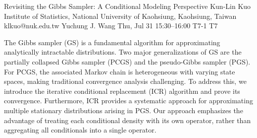 \begin{talk}
  {Revisiting the Gibbs Sampler: A Conditional Modeling Perspective}%
  {Kun-Lin Kuo}%
  {Institute of Statistics, National University of Kaohsiung, Kaohsiung, Taiwan}%
  {klkuo@nuk.edu.tw}%
  {Yuchung J. Wang}%
  {}%
  {Thu, Jul 31 15:30–16:00}%
  {T7-1}%
  {T7}%
  {}%
				
			
The Gibbs sampler (GS) is a fundamental algorithm for approximating analytically intractable distributions.
Two major generalizations of GS are the partially collapsed Gibbs sampler (PCGS) and the pseudo-Gibbs sampler (PGS). For PCGS, the associated Markov chain is heterogeneous with varying state spaces, making traditional convergence analysis challenging. To address this, we introduce the iterative conditional replacement (ICR) algorithm and prove its convergence. Furthermore, ICR provides a systematic approach for approximating multiple stationary distributions arising in PGS.
Our approach emphasizes the advantage of treating each conditional density with its own operator, rather than aggregating all conditionals into a single operator.

\medskip

\end{talk}

